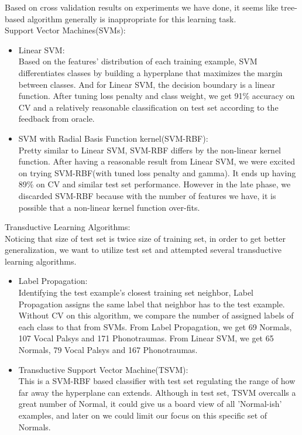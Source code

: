 \indent Based on cross validation results on experiments we have done, it seems like tree-based algorithm generally is inappropriate for this learning task. \\

Support Vector Machines(SVMs):\\
\begin{itemize}
	\item Linear SVM:\\
	Based on the features' distribution of each training example, SVM differentiates classes by building a hyperplane that maximizes the margin between classes. And for Linear SVM, the decision boundary is a linear function. After tuning loss penalty and class weight, we get 91\% accuracy on CV and a relatively reasonable classification on test set according to the feedback from oracle.\\
	\item SVM with Radial Basis Function kernel(SVM-RBF):\\
	Pretty similar to Linear SVM, SVM-RBF differs by the non-linear kernel function. After having a reasonable result from Linear SVM, we were excited on trying SVM-RBF(with tuned loss penalty and gamma). It ends up having 89\% on CV and similar test set performance. However in the late phase, we discarded SVM-RBF because with the number of features we have, it is possible that a non-linear kernel function over-fits. \\
\end{itemize}

Transductive Learning Algorithms:\newline\\
\indent Noticing that size of test set is twice size of training set, in order to get better generalization, we want to utilize test set and attempted several transductive learning algorithms. \\
\begin{itemize}
	\item Label Propagation:\\
	Identifying the test example's closest training set neighbor, Label Propagation assigns the same label that neighbor has to the test example. Without CV on this algorithm, we compare the number of assigned labels of each class to that from SVMs. From Label Propagation, we get 69 Normals, 107 Vocal Palsys and 171 Phonotraumas. From Linear SVM, we get 65 Normals, 79 Vocal Palsys and 167 Phonotraumas.\\
	\item Transductive Support Vector Machine(TSVM):\\
	This is a SVM-RBF based classifier with test set regulating the range of how far away the hyperplane can extends. Although in test set, TSVM overcalls a great number of Normal, it could give us a board view of all 'Normal-ish' examples, and later on we could limit our focus on this specific set of Normals. \\
\end{itemize}

